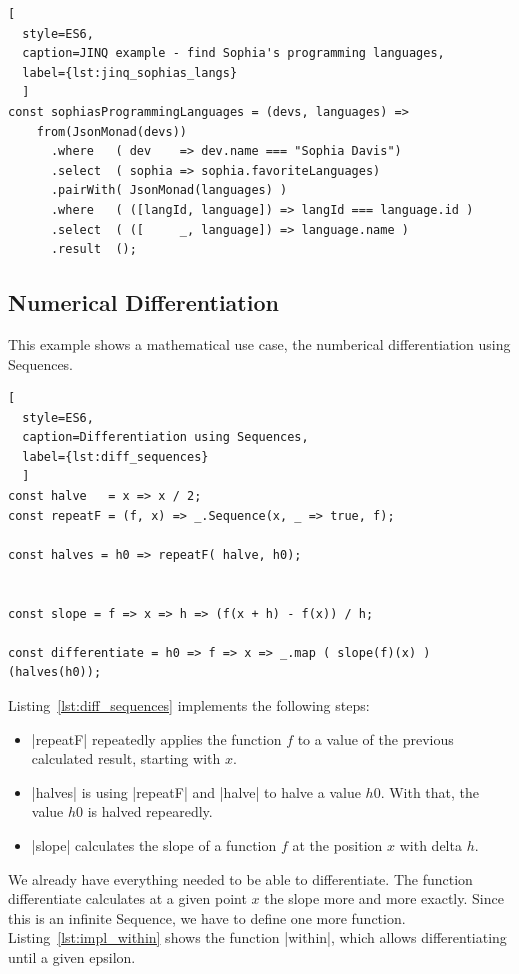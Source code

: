 \begin{lstlisting}[
  style=ES6, 
  caption=JINQ example - find Sophia's programming languages,
  label={lst:jinq_sophias_langs}
  ]
const sophiasProgrammingLanguages = (devs, languages) =>
    from(JsonMonad(devs))
      .where   ( dev    => dev.name === "Sophia Davis")
      .select  ( sophia => sophia.favoriteLanguages)
      .pairWith( JsonMonad(languages) )
      .where   ( ([langId, language]) => langId === language.id )
      .select  ( ([     _, language]) => language.name )
      .result  ();
\end{lstlisting}

\subsection{Numerical Differentiation}
\label{sub:Numerical Differentiation}
This example shows a mathematical use case, the numberical differentiation using Sequences.

\begin{lstlisting}[
  style=ES6, 
  caption=Differentiation using Sequences,
  label={lst:diff_sequences}
  ]
const halve   = x => x / 2;
const repeatF = (f, x) => _.Sequence(x, _ => true, f);

const halves = h0 => repeatF( halve, h0);


const slope = f => x => h => (f(x + h) - f(x)) / h;

const differentiate = h0 => f => x => _.map ( slope(f)(x) ) (halves(h0));
\end{lstlisting}

Listing~\ref{lst:diff_sequences} implements the following steps: 


\begin{itemize}
  \item{|repeatF| repeatedly applies the function $f$ to a value of the
    previous calculated result, starting with $x$.}
  \item{ |halves| is using |repeatF| and |halve| to halve a value $h0$. With
      that, the value $h0$ is halved repearedly.} 
    \item{|slope| calculates the slope of a function $f$ at the position $x$
      with delta $h$.}
 \end{itemize}

We already have everything needed to be able to differentiate.  The function
differentiate calculates at a given point $x$ the slope more and more exactly.
Since this is an infinite Sequence, we have to define one more function.
Listing~\ref{lst:impl_within} shows the function |within|, which allows differentiating until a
given epsilon.

